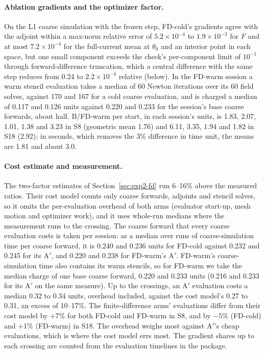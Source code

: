 \documentclass{anvil-paper}
\begin{document}
\paragraph{Ablation gradients and the optimizer factor.}
On the L1 coarse simulation with the frozen step, FD-cold's gradients agree with the
adjoint within a max-norm relative error of $5.2\times10^{-4}$ to
$1.9\times10^{-3}$ for $F$ and at most $7.2\times10^{-4}$ for the
full-current mean at $\theta_0$ and an interior point in each space, but
one small component exceeds the check's per-component limit of $10^{-1}$
through forward-difference truncation, which a central difference with the
same step reduces from 0.24 to $2.2\times10^{-4}$ relative
(below). In
the FD-warm session a warm stencil evaluation takes a median of 60 Newton iterations over its 60
field solves, against 170 and 167 for a cold coarse evaluation, and is
charged a median of 0.117 and
0.126 units against 0.220 and 0.233 for the session's base coarse forwards,
about half. B/FD-warm per start, in each session's units, is 1.83,
2.07, 1.01, 1.38 and 3.23 in S8 (geometric mean 1.76) and 6.11, 3.35,
1.94 and 1.82 in S18 (2.92); in seconds, which removes the 3\%
difference in time unit, the means are 1.81 and about 3.0.

\paragraph{Cost estimate and measurement.}
The two-factor estimates of Section~\ref{sec:exp2-fd} run 6--16\% above
the measured ratios. Their cost model counts only coarse forwards, adjoints and
stencil solves, so it omits the per-evaluation overhead of both arms
(evaluator start-up, mesh motion and optimizer work), and it uses
whole-run medians where the measurement runs to the crossing. The coarse
forward that every coarse evaluation costs is taken per session: as a
median over runs of coarse-simulation time per coarse forward, it is 0.240
and 0.236 units for FD-cold against 0.232 and 0.245 for its A$'$, and
0.220 and 0.238 for FD-warm's A$'$. FD-warm's coarse-simulation time also
contains its warm stencils, so for FD-warm we take the median charge of
one base coarse forward, 0.220 and 0.233 units (0.216 and 0.233 for its
A$'$ on the same measure). Up to the
crossings, an A$'$ evaluation costs a median 0.32 to 0.34 units, overhead
included, against the cost model's 0.27 to 0.31, an excess of 10--17\%. The
finite-difference arms' evaluations differ from their cost model by +7\% for both
FD-cold and FD-warm in S8, and by $-5$\% (FD-cold) and +1\% (FD-warm) in S18. The overhead weighs most against A$'$'s cheap evaluations, which
is where the cost model errs most. The gradient shares up to
each crossing are counted from the evaluation timelines in the package.
\end{document}
